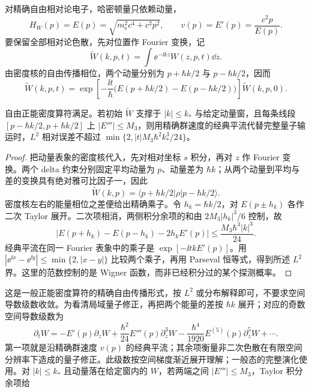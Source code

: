 对精确自由相对论电子，哈密顿量只依赖动量，
\[
H_W(p)=E(p)=\sqrt{m_{\mathrm e}^2c^4+c^2p^2},
\qquad
v(p)=E'(p)=\frac{c^2p}{E(p)}.
\]
要保留全部相对论色散，先对位置作 Fourier 变换，记
\[
\widetilde W(k,p,t)=\int\ee^{-\ii kz}W(z,p,t)\dd z.
\]
由密度核的自由传播相位，两个动量分别为 $p+\hbar k/2$ 与 $p-\hbar k/2$，因而
\begin{equation}
\widetilde W(k,p,t)=\exp\!\left[-\frac{\ii t}{\hbar}
\bigl(E(p+\hbar k/2)-E(p-\hbar k/2)\bigr)\right]
\widetilde W(k,p,0).
\label{eq:electron-free-wigner-exact-multiplier}
\end{equation}
\begin{proposition}
自由正能密度算符满足。若初始 $\widetilde W$ 支撑于 $|k|\le k_*$ 与给定动量窗，且每条线段 $[p-\hbar k/2,p+\hbar k/2]$ 上 $|E'''|\le M_3$，则用精确群速度的经典平流代替完整量子输运时，$L^2$ 相对误差不超过 $\min\{2,|t|M_3\hbar^2k_*^3/24\}$。
\end{proposition}
\begin{proof}
把动量表象的密度核代入，先对相对坐标 $s$ 积分，再对 $z$ 作 Fourier 变换。两个 delta 约束分别固定平均动量为 $p$、动量差为 $\hbar k$；从两个动量到平均与差的变换具有绝对雅可比因子一，因此
\[
\widetilde W(k,p)=\langle p+\hbar k/2|\rho|p-\hbar k/2\rangle.
\]
密度核左右的能量相位之差便给出精确乘子。令 $h_k=\hbar k/2$，对 $E(p\pm h_k)$ 各作二次 Taylor 展开。二次项相消，两侧积分余项的和由 $2M_3|h_k|^3/6$ 控制，故
\[
\left|E(p+h_k)-E(p-h_k)-2h_kE'(p)\right|
\le\frac{M_3\hbar^3|k|^3}{24}.
\]
经典平流在同一 Fourier 表象中的乘子是 $\exp[-\ii tkE'(p)]$。用 $|\ee^{\ii x}-\ee^{\ii y}|\le\min\{2,|x-y|\}$ 比较两个乘子，再用 Parseval 恒等式，得到所述 $L^2$ 界。这里的范数控制的是 Wigner 函数，而非已经积分过的某个探测概率。
\end{proof}
这是一般正能密度算符的精确自由传播形式，按 $L^2$ 或分布解释即可，不要求空间导数级数收敛。为看清局域量子修正，再把两个能量的差按 $\hbar k$ 展开；对应的奇数空间导数级数为
\begin{equation}
{
\partial_tW
=-E'(p)\partial_zW
+\frac{\hbar^2}{24}E'''(p)\partial_z^3W
-\frac{\hbar^4}{1920}E^{(5)}(p)\partial_z^5W+\cdots.}
\label{eq:relativistic_free_moyal}
\end{equation}
第一项就是沿精确群速度 $v(p)$ 的经典平流；其余项衡量非二次色散在有限空间分辨率下造成的量子修正。此级数按空间梯度渐近展开理解；一般态的完整演化使用。对 $|k|\le k_*$ 且动量落在给定窗内的 $W$，若两端之间 $|E'''|\le M_3$，Taylor 积分余项给

